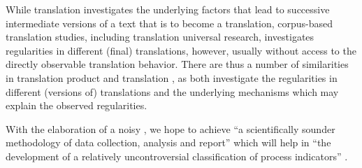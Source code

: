 \documentclass[output=paper]{LSP/langsci}
\begin{document}
While translation  investigates the underlying factors that lead to successive intermediate versions of a text that is to become a translation, corpus-based translation studies, including translation universal research, investigates regularities in different (final) translations, however, usually without access to the directly observable translation behavior. There are thus a number of similarities in translation product and translation , as both investigate the regularities in different (versions of) translations and the underlying mechanisms which may explain the observed regularities. 

With the elaboration of a noisy , we hope to achieve ``a scientifically sounder methodology of data collection, analysis and report'' which will help in ``the development of a relatively uncontroversial classification of process indicators'' \citep[260]{Bernardini2001}.

\sloppy
\printbibliography[heading=subbibliography,notkeyword=this]
\end{document}
